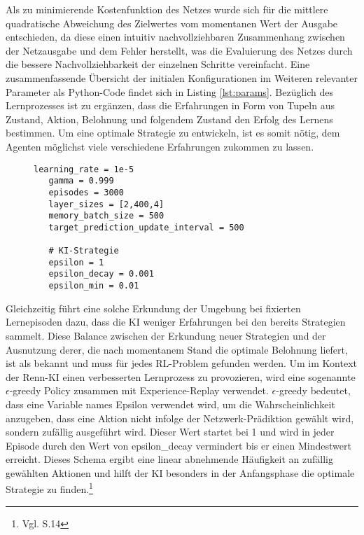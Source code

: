 Als zu minimierende Kostenfunktion des Netzes wurde sich für die mittlere quadratische Abweichung des Zielwertes vom momentanen Wert der Ausgabe entschieden, da diese einen intuitiv nachvollziehbaren Zusammenhang zwischen der Netzausgabe und
dem Fehler herstellt, was die Evaluierung des Netzes durch die bessere Nachvollziehbarkeit der einzelnen Schritte vereinfacht.
Eine zusammenfassende Übersicht der initialen Konfigurationen im Weiteren relevanter Parameter als Python-Code findet sich in Listing \ref{lst:params}.
Bezüglich des Lernprozesses ist zu ergänzen, dass die Erfahrungen in Form von Tupeln aus Zustand, Aktion, Belohnung und folgendem Zustand den Erfolg des Lernens bestimmen. Um eine optimale Strategie zu entwickeln, ist es somit nötig, dem Agenten möglichst viele verschiedene Erfahrungen zukommen zu lassen.
\begin{figure}
\begin{lstlisting}[label={lst:params}, caption={Initiale Konfiguration von KI-Parametern}]
   learning_rate = 1e-5 
   gamma = 0.999
   episodes = 3000
   layer_sizes = [2,400,4]
   memory_batch_size = 500
   target_prediction_update_interval = 500
   
   # KI-Strategie
   epsilon = 1
   epsilon_decay = 0.001
   epsilon_min = 0.01
\end{lstlisting}
\end{figure}
Gleichzeitig führt eine solche Erkundung der Umgebung bei fixierten Lernepisoden dazu, dass die KI weniger Erfahrungen bei den bereits  Strategien sammelt. Diese Balance zwischen der Erkundung neuer Strategien und der Ausnutzung derer, die nach momentanem Stand die optimale Belohnung liefert, ist als  bekannt und muss für jedes RL-Problem gefunden werden. Um im Kontext der Renn-KI einen verbesserten Lernprozess zu provozieren, wird eine sogenannte \(\epsilon\)-greedy Policy zusammen mit Experience-Replay verwendet. \(\epsilon\)-greedy bedeutet, dass eine Variable names Epsilon verwendet wird, um die Wahrscheinlichkeit anzugeben, dass eine Aktion nicht infolge der Netzwerk-Prädiktion gewählt wird, sondern zufällig ausgeführt wird. Dieser Wert startet bei 1 und wird in jeder Episode durch den Wert von epsilon\_decay vermindert bis er einen Mindestwert erreicht. Dieses Schema ergibt eine linear abnehmende Häufigkeit an zufällig gewählten Aktionen und hilft der KI besonders in der Anfangsphase die optimale Strategie zu finden.\footnote{Vgl. \cite{deep_reinforcement_learning} S.14}\\
